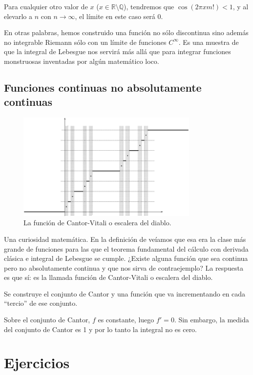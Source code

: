 \documentclass[nochap,palatino]{apuntes}
\begin{document}
Para cualquier otro valor de $x$ ($x ∈ ℝ\setminus ℚ$), tendremos que $\cos (2πxm!) < 1$, y al elevarlo a $n$ con $n \to ∞$, el límite en este caso será 0.

En otras palabras, hemos construido una función no sólo discontinua sino además no integrable Riemann sólo con un límite de funciones $C^∞$. Es una muestra de que la integral de Lebesgue nos servirá más allá que para integrar funciones monstruosas inventadas por algún matemático loco.

\section{Funciones continuas no absolutamente continuas}

\begin{figure}[hbtp]
\centering
\includegraphics[width=0.8\textwidth]{img/CantorVitaliFunction.png}
\caption{La función de Cantor-Vitali o escalera del diablo.}
\label{fig:CantorVitalFunc}
\end{figure}

Una curiosidad matemática. En la definición de  veíamos que esa era la clase más grande de funciones para las que el teorema fundamental del cálculo con derivada clásica e integral de Lebesgue se cumple. ¿Existe alguna función que sea continua pero no absolutamente continua y que nos sirva de contraejemplo? La respuesta es que sí: es la llamada función de Cantor-Vitali o escalera del diablo.

\begin{defn} Se construye el conjunto de Cantor y una función que va incrementando en cada ``tercio'' de ese conjunto.
\end{defn}

Sobre el conjunto de Cantor, $f$ es constante, luego $f' = 0$. Sin embargo, la medida del conjunto de Cantor es 1 y por lo tanto la integral no es cero.

\chapter{Ejercicios}
\label{chap:Ejercicios}


\nocite{terence10,folland99}

{}
\printindex
\end{document}
